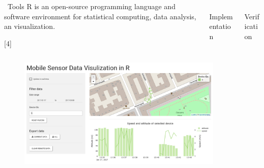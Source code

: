 \documentclass[final]{beamer}
\newlength{\onecolwid}
\newlength{\twocolwid}
\begin{document}
\begin{frame}[t]
\begin{columns}[t]
\begin{column}{\twocolwid}
	\begin{columns}[t, totalwidth=\twocolwid]
		\begin{column}{\onecolwid}\vspace{-.6in}
			\begin{block}{\faWrench \, Tools}
				R is an open-source programming language and software environment for statistical computing, data analysis, an visualization.

				[4]
				\lipsum[66]
			\end{block}
		\end{column}

		\begin{column}{\onecolwid}\vspace{-.6in}
			\begin{block}{\faCode \, Implementation}
				\blindtext
				\lipsum[75]
				\lipsum[66]
			\end{block}
		\end{column}
	\end{columns}

	\begin{figure}
		\includegraphics[width=\twocolwid]{ss_ui.png}
	\end{figure}

	\vspace{2cm}

	\begin{center}
		\ccbynd
	\end{center}
\end{column}

\begin{column}{\onecolwid}
	\begin{block}{\faCheckCircle \, Verification}
		\lipsum[75]
		\lipsum[66]
	\end{block}


\end{column}
\end{columns}
\end{frame}
\end{document}

